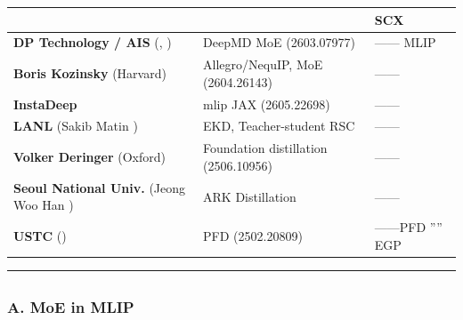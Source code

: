 \documentclass[
  12pt,
]{article}
\begin{document}
\begin{longtable}[]{@{}
  >{\raggedright\arraybackslash}p{}
  >{\raggedright\arraybackslash}p{}
  >{\centering\arraybackslash}p{}@{}}
\toprule\noalign{}
\begin{minipage}[b]{\linewidth}\raggedright

\end{minipage} & \begin{minipage}[b]{\linewidth}\raggedright

\end{minipage} & \begin{minipage}[b]{\linewidth}\centering
 SCX 
\end{minipage} \\
\midrule\noalign{}
\endhead
\bottomrule\noalign{}
\endlastfoot
\textbf{DP Technology / AIS} (, ) & DeepMD MoE (2603.07977)
& ------ MLIP  \\
\textbf{Boris Kozinsky } (Harvard) & Allegro/NequIP, MoE (2604.26143)
& ------ \\
\textbf{InstaDeep} & mlip JAX  (2605.22698) &
------ \\
\textbf{LANL} (Sakib Matin ) & EKD, Teacher-student RSC &
------ \\
\textbf{Volker Deringer } (Oxford) & Foundation distillation
(2506.10956) & ------ \\
\textbf{Seoul National Univ.} (Jeong Woo Han ) & ARK Distillation &
------ \\
\textbf{USTC} () & PFD  (2502.20809) & ------PFD
'''' EGP  \\
\end{longtable}

\begin{center}\rule{0.5\linewidth}{0.5pt}\end{center}

\subsection{}\label{ux53c2ux8003ux6587ux732e}

\subsubsection{A. MoE in MLIP}\label{a.-moe-in-mlip}
\end{document}
